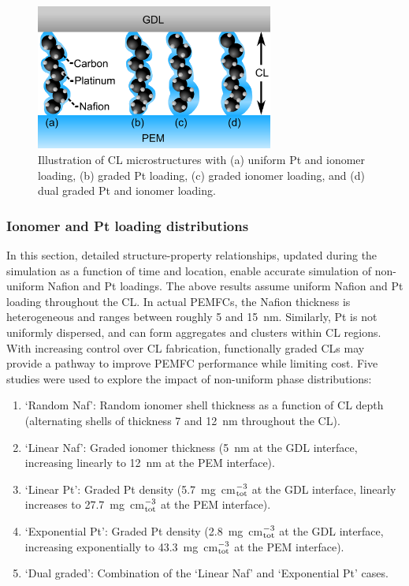 \documentclass[final,3p,times,twocolumn]{elsarticle}    %
\begin{document}
\begin{figure}[!tb]
    \centering
    \includegraphics[width=3.07in]{figures/design-study-3_07in.png}
    \caption{Illustration of CL microstructures with (a) uniform Pt and ionomer loading, (b) graded Pt loading, (c) graded ionomer loading, and (d) dual graded Pt and ionomer loading.}
    \label{fig:design-study}
\end{figure}

\subsubsection{Ionomer and Pt loading distributions}

In this section, detailed structure-property relationships, updated during the simulation as a function of time and location, enable accurate simulation of non-uniform Nafion and Pt loadings. The above results assume uniform Nafion and Pt loading throughout the CL. In actual PEMFCs, the Nafion thickness is heterogeneous and ranges between roughly 5 and 15~nm. Similarly, Pt is not uniformly dispersed, and can form aggregates and clusters within CL regions. With increasing control over CL fabrication, functionally graded CLs may provide a pathway to improve PEMFC performance while limiting cost. Five studies were used to explore the impact of non-uniform phase distributions:
\begin{enumerate}
    \item `Random Naf': Random ionomer shell thickness as a function of CL depth (alternating shells of thickness 7 and 12~nm throughout the CL).
    \item `Linear Naf': Graded ionomer thickness (5~nm at the GDL interface, increasing linearly to 12~nm at the PEM interface).
    \item `Linear Pt': Graded Pt density (5.7~mg~cm$^{-3}_{\rm tot}$ at the GDL interface, linearly increases to 27.7~mg~cm$^{-3}_{\rm tot}$ at the PEM interface).
    \item `Exponential Pt': Graded Pt density (2.8~mg~cm$^{-3}_{\rm tot}$ at the GDL interface, increasing exponentially to 43.3~mg~cm$^{-3}_{\rm tot}$ at the PEM interface).
    \item `Dual graded': Combination of the `Linear Naf' and `Exponential Pt' cases.
\end{enumerate}
\end{document}
